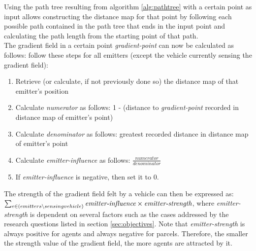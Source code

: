 Using the path tree resulting from algorithm \ref{alg:pathtree} with a certain point as input allows constructing the distance map for that point by following each possible path contained in the path tree that ends in the input point and calculating the path length from the starting point of that path.
\\
The gradient field in a certain point \emph{gradient-point} can now be calculated as follows: follow these steps for all emitters (except the vehicle currently sensing the gradient field):
\begin{enumerate}
    \item Retrieve (or calculate, if not previously done so) the distance map of that emitter's position
    \item Calculate \emph{numerator} as follows: 1 - (distance to \emph{gradient-point} recorded in distance map of emitter's point)
    \item Calculate \emph{denominator} as follows: greatest recorded distance in distance map of emitter's point
    \item Calculate \emph{emitter-influence} as follows: $\frac{numerator}{denominator}$
    \item If \emph{emitter-influence} is negative, then set it to 0.
\end{enumerate}

\noindent
The strength of the gradient field felt by a vehicle can then be expressed as: 
\\ $\sum\nolimits_{e \in (emitters \setminus sensing vehicle)} \emph{emitter-influence} \times \emph{emitter-strength}$, where \emph{emitter-strength} is dependent on several factors such as the cases addressed by the research questions listed in section \ref{sec:objectives}. Note that \emph{emitter-strength} is always positive for agents and always negative for parcels. Therefore, the smaller the strength value of the gradient field, the more agents are attracted by it.

